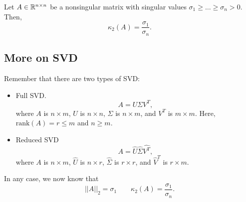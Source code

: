 \documentclass[letterpaper]{article}
\newcommand{\0}{\mathbf{0}}
\begin{document}
\begin{theorem}{}{}
    Let $A \in \mathbb{R}^{n \times n}$ be a nonsingular matrix with singular values $\sigma_1 \geq \hdots \geq \sigma_n > 0$. Then, 
    \[\kappa_{2}(A) = \frac{\sigma_1}{\sigma_n}.\]
\end{theorem}

\subsection{More on SVD}
Remember that there are two types of SVD: 
\begin{itemize}
    \item Full SVD.
    \[A = U\Sigma V^T,\]
    where $A$ is $n \times m$, $U$ is $n \times n$, $\Sigma$ is $n \times m$, and $V^T$ is $m \times m$. Here, $\text{rank}(A) = r \leq m$ and $n \geq m$. 

    \item Reduced SVD 
    \[A = \hat{U}\hat{\Sigma}\hat{V^T},\]
    where $A$ is $n \times m$, $\hat{U}$ is $n \times r$, $\hat{\Sigma}$ is $r \times r$, and $\hat{V}^T$ is $r \times m$.
\end{itemize}
In any case, we now know that \[||A||_2 = \sigma_1 \qquad \kappa_{2}(A) = \frac{\sigma_1}{\sigma_n}.\]
\end{document}
